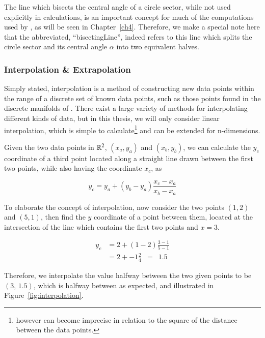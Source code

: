 The line which bisects the central angle of a circle sector, while not used explicitly in calculations, is an important concept for much of the computations used by , as will be seen in Chapter~\ref{ch4}. Therefore, we make a special note here that the abbreviated, ``\gls{bisectingLine}'', indeed refers to this line which splits the circle sector and its central angle $\alpha$ into two equivalent halves.

%
%
\subsubsection{Interpolation \& Extrapolation}
\label{ch2sETBssGsssIE}
Simply stated, interpolation is a method of constructing new data points within the range of a discrete set of known data points, such as those points found in the discrete manifolds of \tdd{}. There exist a large variety of methods for interpolating different kinds of data, but in this thesis, we will only consider linear interpolation, which is simple to calculate\footnote{however can become imprecise in relation to the square of the distance between the data points.} and can be extended for n-dimensions.

Given the two data points in $\mathbb{R}^{2}$, $(x_a, y_a)$ and $(x_b, y_b)$, we can calculate the $y_c$ coordinate of a third point located along a straight line drawn between the first two points, while also having the coordinate $x_c$, as

\begin{equation}
	y_c = y_a + (y_b - y_a) \frac{x_c - x_a}{x_b - x_a}
	\label{eq:interpolationGeneral}
\end{equation}

To elaborate the concept of interpolation, now consider the two points $(1, 2)$ and $(5, 1)$, then find the $y$ coordinate of a point between them, located at the intersection of the line which contains the first two points and $x = 3$.

\begin{align}
	y_c & = 2 + (1 - 2) \frac{3 - 1}{5 - 1} \\
	& = 2 + -1 \frac{2}{4} \enspace = \enspace  1.5
	\label{eq:interpolationSpecific}
\end{align}

Therefore, we interpolate the value halfway between the two given points to be $(3,\,1.5)$, which is halfway between as expected, and illustrated in Figure~\ref{fig:interpolation}.

